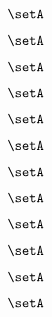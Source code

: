 \begin{forslides}
    \begin{equation}
        \label{eq:slides-processes-158}
        \setA
    \end{equation}

    \begin{equation}
        \label{eq:slides-processes-159}
        \setA
    \end{equation}

    \begin{equation}
        \label{eq:slides-processes-160}
        \setA
    \end{equation}

    \begin{equation}
        \label{eq:slides-processes-161}
        \setA
    \end{equation}

    \begin{equation}
        \label{eq:slides-processes-162}
        \setA
    \end{equation}

    \begin{equation}
        \label{eq:slides-processes-163}
        \setA
    \end{equation}

    \begin{equation}
        \label{eq:slides-processes-164}
        \setA
    \end{equation}

    \begin{equation}
        \label{eq:slides-processes-165}
        \setA
    \end{equation}

    \begin{equation}
        \label{eq:slides-processes-166}
        \setA
    \end{equation}

    \begin{equation}
        \label{eq:slides-processes-167}
        \setA
    \end{equation}

    \begin{equation}
        \label{eq:slides-processes-168}
        \setA
    \end{equation}

    \begin{equation}
        \label{eq:slides-processes-169}
        \setA
    \end{equation}

\end{forslides}